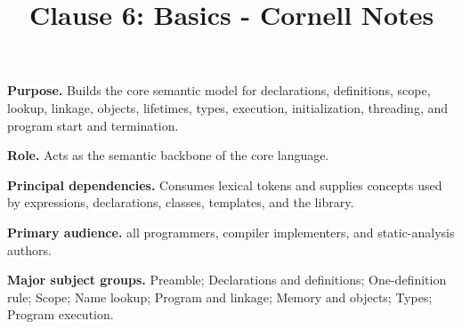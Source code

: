 \documentclass[11pt,letterpaper]{article}
\title{Clause 6: Basics - Cornell Notes}
\author{}
\date{}
\begin{document}
\maketitle
\begin{CornellReferenceOrientationBox}
\textbf{Purpose.} Builds the core semantic model for declarations, definitions, scope, lookup, linkage, objects, lifetimes, types, execution, initialization, threading, and program start and termination.
\par\textbf{Role.} Acts as the semantic backbone of the core language.
\par\textbf{Principal dependencies.} Consumes lexical tokens and supplies concepts used by expressions, declarations, classes, templates, and the library.
\par\textbf{Primary audience.} all programmers, compiler implementers, and static-analysis authors.
\par\textbf{Major subject groups.} Preamble; Declarations and definitions; One-definition rule; Scope; Name lookup; Program and linkage; Memory and objects; Types; Program execution.
\end{CornellReferenceOrientationBox}
\end{document}
